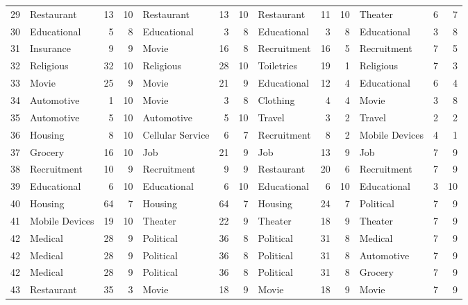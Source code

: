 \begin{figure}[htbp]
\begin{tabular}{rlrrlrrlrrlrr}
    29    & Restaurant & 13    & 10    & Restaurant & 13    & 10    & Restaurant & 11    & 10    & Theater & 6     & 7 \\
    30    & Educational & 5     & 8     & Educational & 3     & 8     & Educational & 3     & 8     & Educational & 3     & 8 \\
    31    & Insurance & 9     & 9     & Movie & 16    & 8     & Recruitment & 16    & 5     & Recruitment & 7     & 5 \\
    32    & Religious & 32    & 10    & Religious & 28    & 10    & Toiletries & 19    & 1     & Religious & 7     & 3 \\
    33    & Movie & 25    & 9     & Movie & 21    & 9     & Educational & 12    & 4     & Educational & 6     & 4 \\
    34    & Automotive & 1     & 10    & Movie & 3     & 8     & Clothing & 4     & 4     & Movie & 3     & 8 \\
    35    & Automotive & 5     & 10    & Automotive & 5     & 10    & Travel & 3     & 2     & Travel & 2     & 2 \\
    36    & Housing & 8     & 10    & Cellular Service & 6     & 7     & Recruitment & 8     & 2     & Mobile Devices & 4     & 1 \\
    37    & Grocery & 16    & 10    & Job   & 21    & 9     & Job   & 13    & 9     & Job   & 7     & 9 \\
    38    & Recruitment & 10    & 9     & Recruitment & 9     & 9     & Restaurant & 20    & 6     & Recruitment & 7     & 9 \\
    39    & Educational & 6     & 10    & Educational & 6     & 10    & Educational & 6     & 10    & Educational & 3     & 10 \\
    40    & Housing & 64    & 7     & Housing & 64    & 7     & Housing & 24    & 7     & Political & 7     & 9 \\
    41    & Mobile Devices & 19    & 10    & Theater & 22    & 9     & Theater & 18    & 9     & Theater & 7     & 9 \\
    42    & Medical & 28    & 9     & Political & 36    & 8     & Political & 31    & 8     & Medical & 7     & 9 \\
    42    & Medical & 28    & 9     & Political & 36    & 8     & Political & 31    & 8     & Automotive & 7     & 9 \\
    42    & Medical & 28    & 9     & Political & 36    & 8     & Political & 31    & 8     & Grocery & 7     & 9 \\
    43    & Restaurant & 35    & 3     & Movie & 18    & 9     & Movie & 18    & 9     & Movie & 7     & 9 \\

\end{tabular}
\end{figure}
